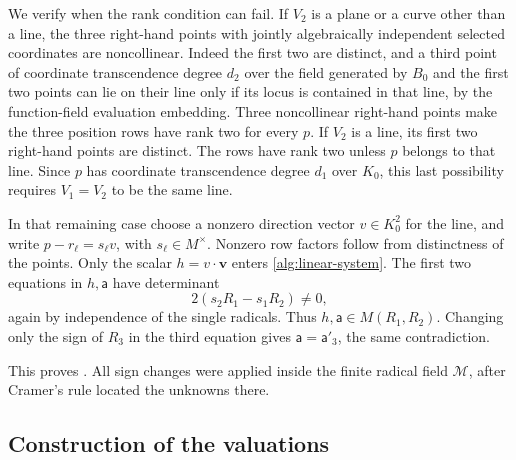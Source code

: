 We verify when the rank condition can fail. If \(V_2\) is a plane
or a curve other than a line, the three right-hand points with jointly algebraically independent selected coordinates
are noncollinear. Indeed the first two are distinct, and a third point of coordinate transcendence degree \(d_2\) over the field generated by \(B_0\) and the first two points can lie on their line only if its locus is contained
in that line, by the function-field evaluation embedding. Three noncollinear right-hand points
make the three position rows have rank two for every \(p\).
If \(V_2\) is a line, its first two right-hand points are distinct. The rows
have rank two unless \(p\) belongs to that line. Since \(p\) has coordinate transcendence degree \(d_1\) over \(K_0\), this last possibility requires
\(V_1=V_2\) to be the same line.

In that remaining case choose a nonzero direction vector
\(v\in K_0^2\) for the line, and write
\(p-r_\ell=s_\ell v\), with \(s_\ell\in M^\times\).
Nonzero row factors follow from distinctness of the points.
Only the scalar \(h=v\cdot \mathbf v\) enters
\eqref{alg:linear-system}. The first two equations in \(h,\mathsf a\)
have determinant
\[
 2(s_2R_1-s_1R_2)\ne0,
\]
again by independence of the single radicals. Thus
\(h,\mathsf a\in M(R_1,R_2)\). Changing only the sign of \(R_3\) in
the third equation gives \(\mathsf a=\mathsf a'_3\), the same contradiction.

This proves . All sign changes were applied
inside the finite radical field \(\mathcal M\), after Cramer's rule
located the unknowns there.

\subsection{Construction of the valuations}\label{sec:valuations-proof}


